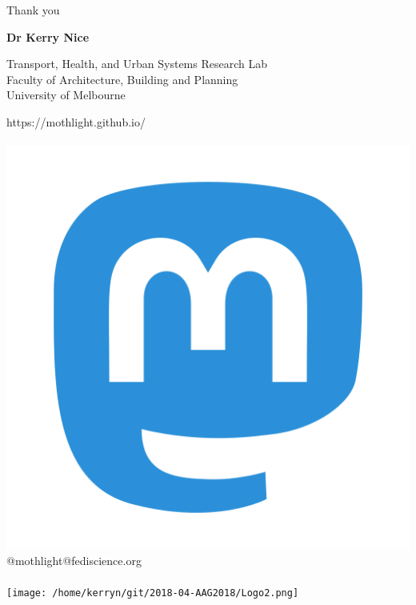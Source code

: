 \documentclass{beamer}
\begin{document}
\begin{frame}{Thank you}
\begin{center}
\textbf{Dr Kerry Nice} 

Transport, Health, and Urban Systems Research Lab\\ Faculty of Architecture, Building and Planning\\ University of Melbourne



https://mothlight.github.io/
\\
~
\\
\includegraphics[scale=0.02,trim = 0mm 0mm 0mm 0mm, clip]{207_Mastodon_logo_logos-512.png} @mothlight@fediscience.org
\\
~
\\
\texttt{[image: /home/kerryn/git/2018-04-AAG2018/Logo2.png]}
\end{center} 
\end{frame}
\end{document}
